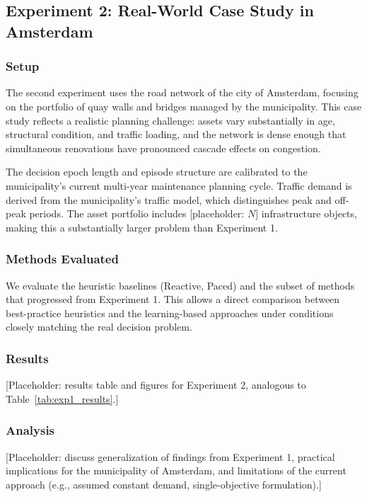 \documentclass[3p, twocolumn]{elsarticle}
\begin{document}
\subsection{Experiment 2: Real-World Case Study in Amsterdam}
\label{sec:exp2}

\subsubsection{Setup}

The second experiment uses the road network of the city of Amsterdam, focusing on the portfolio of quay walls and bridges managed by the municipality. This case study reflects a realistic planning challenge: assets vary substantially in age, structural condition, and traffic loading, and the network is dense enough that simultaneous renovations have pronounced cascade effects on congestion.

The decision epoch length and episode structure are calibrated to the municipality's current multi-year maintenance planning cycle. Traffic demand is derived from the municipality's traffic model, which distinguishes peak and off-peak periods. The asset portfolio includes [placeholder: $N$] infrastructure objects, making this a substantially larger problem than Experiment 1.

\subsubsection{Methods Evaluated}

We evaluate the heuristic baselines (Reactive, Paced) and the subset of methods that progressed from Experiment 1. This allows a direct comparison between best-practice heuristics and the learning-based approaches under conditions closely matching the real decision problem.

\subsubsection{Results}

[Placeholder: results table and figures for Experiment 2, analogous to Table~\ref{tab:exp1_results}.]

\subsubsection{Analysis}

[Placeholder: discuss generalization of findings from Experiment 1, practical implications for the municipality of Amsterdam, and limitations of the current approach (e.g., assumed constant demand, single-objective formulation).]
\end{document}

